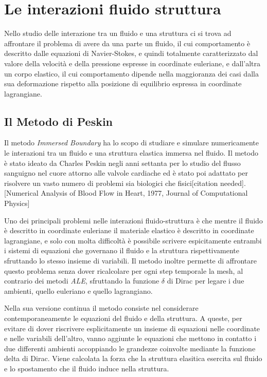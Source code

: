 
\chapter{Le interazioni fluido struttura}

Nello studio delle interazione tra un fluido e una struttura ci si trova ad affrontare il problema di avere da una parte un fluido, il cui comportamento è descritto dalle equazioni di Navier-Stokes, e quindi totalmente caratterizzato dal valore della velocità e della pressione espresse in coordinate euleriane, e dall'altra un corpo elastico, il cui comportamento dipende nella maggioranza dei casi dalla sua deformazione rispetto alla posizione di equilibrio espressa in coordinate lagrangiane.

\section{Il Metodo \IB di Peskin}

Il metodo \textit{Immersed Boundary} ha lo scopo di studiare e simulare numericamente le interazioni tra un fluido e una struttura elastica immersa nel fluido. Il metodo è stato ideato da Charles Peskin negli anni settanta per lo studio del flusso sanguigno nel cuore attorno alle valvole cardiache ed è stato poi adattato per risolvere un vasto numero di problemi sia biologici che fisici[citation needed]. [Numerical Analysis of Blood Flow in Heart, 1977, Journal of Computational Physics]

Uno dei principali problemi nelle interazioni fluido-struttura è che mentre il fluido è descritto in coordinate euleriane il materiale elastico è descritto in coordinate lagrangiane, e solo con molta difficoltà è possibile scrivere espicitamente entrambi i sistemi di equazioni che governano il fluido e la struttura rispettivamente sfruttando lo stesso insieme di variabili. Il metodo \IB inoltre permette di affrontare questo problema senza dover ricalcolare per ogni step temporale la mesh, al contrario dei metodi \textit{ALE}, sfruttando la funzione $\delta$ di Dirac per legare i due ambienti, quello euleriano e quello lagrangiano.

Nella sua versione continua il metodo consiste nel considerare contemporaneamente le equazioni del fluido e della struttura. A queste, per evitare di dover riscrivere esplicitamente un insieme di equazioni nelle  coordinate e nelle variabili dell'altro, vanno aggiunte le equazioni che mettono in contatto i due differenti ambienti accoppiando le grandezze coinvolte mediante la funzione delta di Dirac. Viene calcolata la forza che la struttura elasitica esercita sul fluido e lo spostamento che il fluido induce nella struttura.

